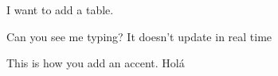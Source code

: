 
I want to add a table.

Can you see me typing? It doesn't update in real time 

This is how you add an accent. Holá
